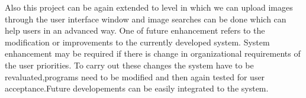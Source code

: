 Also this project can be again extended to level in which we can upload images through the user interface window and image searches can be done which can help users in an advanced way. One of future enhancement refers to the modification or improvements to the currently developed system. System enhancement may be required if there is change in organizational requirements of the user priorities. To carry out these changes the system have to be revaluated,programs need to be modified and then again tested for user acceptance.Future developements can be easily integrated to the system.